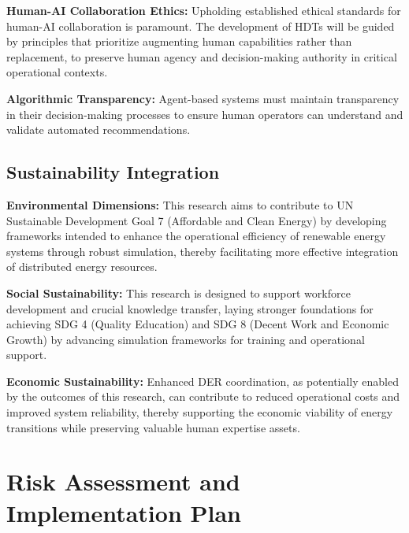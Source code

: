 \documentclass[12pt,a4paper]{article}
\begin{document}
\noindent \textbf{Human-AI Collaboration Ethics:} Upholding established ethical standards for human-AI collaboration is paramount. The development of HDTs will be guided by principles that prioritize augmenting human capabilities rather than replacement, to preserve human agency and decision-making authority in critical operational contexts.

\noindent \textbf{Algorithmic Transparency:} Agent-based systems must maintain transparency in their decision-making processes to ensure human operators can understand and validate automated recommendations.

\subsection{Sustainability Integration}

\noindent \textbf{Environmental Dimensions:} This research aims to contribute to UN Sustainable Development Goal 7 (Affordable and Clean Energy) by developing frameworks intended to enhance the operational efficiency of renewable energy systems through robust simulation, thereby facilitating more effective integration of distributed energy resources.

\noindent \textbf{Social Sustainability:} This research is designed to support workforce development and crucial knowledge transfer, laying stronger foundations for achieving SDG 4 (Quality Education) and SDG 8 (Decent Work and Economic Growth) by advancing simulation frameworks for training and operational support.

\noindent \textbf{Economic Sustainability:} Enhanced DER coordination, as potentially enabled by the outcomes of this research, can contribute to reduced operational costs and improved system reliability, thereby supporting the economic viability of energy transitions while preserving valuable human expertise assets.

\section{Risk Assessment and Implementation Plan}
\label{sec:risks}
\end{document}
